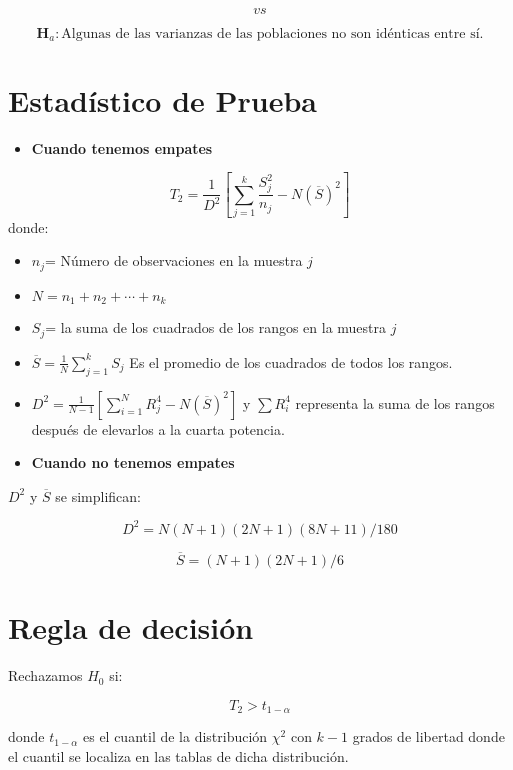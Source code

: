 \documentclass[
  a4paper,
  oneside,
  openany]{book}
\providecommand{\tightlist}{%
  \setlength{\itemsep}{0pt}\setlength{\parskip}{0pt}}
\begin{document}
\[vs\]

\[\textbf{H}_a: \mbox{Algunas de las varianzas de las poblaciones no son idénticas entre sí.}\]

\hypertarget{estaduxedstico-de-prueba-8}{%
\section{Estadístico de Prueba}\label{estaduxedstico-de-prueba-8}}

\begin{itemize}
\tightlist
\item
  \textbf{Cuando tenemos empates}
\end{itemize}

\[T_{2}= \frac{1}{D^2}\left[\sum_{j=1}^{k}\frac{S_{j}^2}{n_j}-N(\overline{S})^2\right]\]
donde:

\begin{itemize}
\item
  \(n_{j}\)= Número de observaciones en la muestra \(j\)
\item
  \(N= n_{1}+n_{2}+\cdots+n_{k}\)
\item
  \(S_{j}\)= la suma de los cuadrados de los rangos en la muestra \(j\)
\item
  \(\overline{S}= \frac{1}{N}\sum_{j=1}^{k}S_{j}\) Es el promedio de los cuadrados de todos los rangos.
\item
  \(D^2=\frac{1}{N-1}\left[\sum_{i=1}^{N}R^4_{j}-N(\overline{S})^2\right]\) y \(\sum{R_{i}^4}\) representa la suma de los rangos después de elevarlos a la cuarta potencia.
\item
  \textbf{Cuando no tenemos empates}
\end{itemize}

\(D^2\) y \(\overline{S}\) se simplifican:

\[D^2=N(N+1)(2N+1)(8N+11)/180\]

\[\overline{S}=(N+1)(2N+1)/6\]

\hypertarget{regla-de-decisiuxf3n-20}{%
\section{Regla de decisión}\label{regla-de-decisiuxf3n-20}}

Rechazamos \(H_0\) si:

\[T_{2}>t_{1-\alpha}\]

donde \(t_{1-\alpha}\) es el cuantil de la distribución \(\chi^2\) con \(k-1\) grados de libertad donde el cuantil se localiza en las tablas de dicha distribución.
\end{document}
